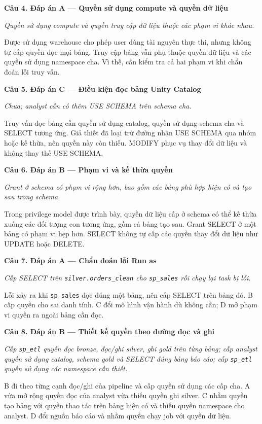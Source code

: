 \noindent\textbf{Câu 4. Đáp án A --- Quyền sử dụng compute và quyền dữ liệu}\par
\noindent\emph{Quyền sử dụng compute và quyền truy cập dữ liệu thuộc các phạm vi khác nhau.}\par
Được sử dụng warehouse cho phép user dùng tài nguyên thực thi, nhưng không tự cấp quyền đọc mọi bảng. Truy cập bảng vẫn phụ thuộc quyền dữ liệu và các quyền sử dụng namespace cha. Vì thế, cần kiểm tra cả hai phạm vi khi chẩn đoán lỗi truy vấn.\par\addvspace{0.8em}

\noindent\textbf{Câu 5. Đáp án C --- Điều kiện đọc bảng Unity Catalog}\par
\noindent\emph{Chưa; analyst cần có thêm USE SCHEMA trên schema cha.}\par
Truy vấn đọc bảng cần quyền sử dụng catalog, quyền sử dụng schema cha và SELECT tương ứng. Giả thiết đã loại trừ đường nhận USE SCHEMA qua nhóm hoặc kế thừa, nên quyền này còn thiếu. MODIFY phục vụ thay đổi dữ liệu và không thay thế USE SCHEMA.\par\addvspace{0.8em}

\noindent\textbf{Câu 6. Đáp án B --- Phạm vi và kế thừa quyền}\par
\noindent\emph{Grant ở schema có phạm vi rộng hơn, bao gồm các bảng phù hợp hiện có và tạo sau trong schema.}\par
Trong privilege model được trình bày, quyền dữ liệu cấp ở schema có thể kế thừa xuống các đối tượng con tương ứng, gồm cả bảng tạo sau. Grant SELECT ở một bảng có phạm vi hẹp hơn. SELECT không tự cấp các quyền thay đổi dữ liệu như UPDATE hoặc DELETE.\par\addvspace{0.8em}

\noindent\textbf{Câu 7. Đáp án A --- Chẩn đoán lỗi Run as}\par
\noindent\emph{Cấp SELECT trên \texttt{silver.orders\_clean} cho \texttt{sp\_sales} rồi chạy lại task bị lỗi.}\par
Lỗi xảy ra khi \texttt{sp\_sales} đọc đúng một bảng, nên cấp SELECT trên bảng đó. B cấp quyền cho sai danh tính. C đổi mô hình vận hành dù không cần; D mở phạm vi quyền ra ngoài bảng cần đọc.\par\addvspace{0.8em}

\noindent\textbf{Câu 8. Đáp án B --- Thiết kế quyền theo đường đọc và ghi}\par
\noindent\emph{Cấp \texttt{sp\_etl} quyền đọc bronze, đọc/ghi silver, ghi gold trên từng bảng; cấp analyst quyền sử dụng catalog, schema gold và SELECT đúng bảng báo cáo; cấp \texttt{sp\_etl} quyền sử dụng các namespace cần thiết.}\par
B đi theo từng cạnh đọc/ghi của pipeline và cấp quyền sử dụng các cấp cha. A vừa mở rộng quyền đọc của analyst vừa thiếu quyền ghi silver. C nhầm quyền tạo bảng với quyền thao tác trên bảng hiện có và thiếu quyền namespace cho analyst. D đổi nguồn báo cáo và nhầm quyền chạy job với quyền dữ liệu.\par\addvspace{0.8em}

